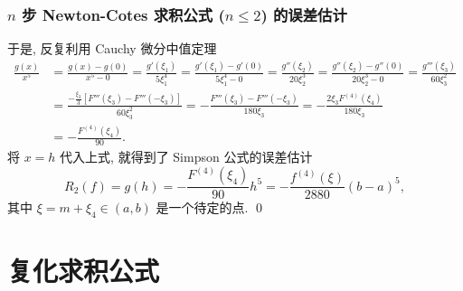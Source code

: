 
\begin{frame}
\frametitle{$n$ 步 Newton-Cotes 求积公式 ($n \leqslant 2$) 的误差估计}

于是, 反复利用 Cauchy 微分中值定理
\begin{align*}
\frac{g(x)}{x^5} & = \frac{g(x) - g(0)}{x^5 - 0} = \frac{g'(\xi_1)}{5 \xi_1^4} = \frac{g'(\xi_1) - g'(0)}{5 \xi_1^4 - 0} = \frac{g''(\xi_2)}{20 \xi_2^3} = \frac{g''(\xi_2) - g''(0)}{20 \xi_2^3 - 0} = \frac{g'''(\xi_3)}{60 \xi_3^2} \\
& = \frac{-\frac{\xi_3}{3}\left[F'''(\xi_3) - F'''(-\xi_3)\right]}{60 \xi_3^2} = -\frac{F'''(\xi_3) - F'''(-\xi_3)}{180 \xi_3} = -\frac{2\xi_3 F^{(4)}(\xi_4)}{180 \xi_3} \\
& = -\frac{F^{(4)}(\xi_4)}{90}.
\end{align*}
将 $x = h$ 代入上式, 就得到了 Simpson 公式的误差估计
\[
R_2(f) = g(h) = -\frac{F^{(4)}(\xi_4)}{90} h^5 = -\frac{f^{(4)}(\xi)}{2880} (b-a)^5,
\]
其中 $\xi = m + \xi_4 \in (a, b)$ 是一个待定的点.
\qed

\end{frame}


\section{复化求积公式}


